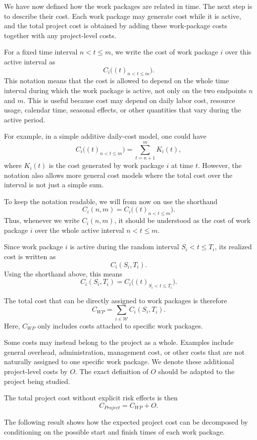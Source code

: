 \documentclass[11pt,a4paper]{article}
\newcommand{\cW}{\mathcal{W}}
\newcommand{\1}{\mathbf{1}}
\theoremstyle{definition}
\theoremstyle{plain}
\theoremstyle{remark}
\numberwithin{equation}{section}
\begin{document}
We have now defined how the work packages are related in time. The next step is to describe their cost. Each work package may generate cost while it is active, and the total project cost is obtained by adding these work-package costs together with any project-level costs.

For a fixed time interval $n<t\leq m$, we write the cost of work package $i$ over this active interval as
\[
C_i\bigl((t)_{n<t\leq m}\bigr).
\]
This notation means that the cost is allowed to depend on the whole time interval during which the work package is active, not only on the two endpoints $n$ and $m$. This is useful because cost may depend on daily labor cost, resource usage, calendar time, seasonal effects, or other quantities that vary during the active period.

For example, in a simple additive daily-cost model, one could have
\[
C_i\bigl((t)_{n<t\leq m}\bigr)
=
\sum_{t=n+1}^{m} K_i(t),
\]
where $K_i(t)$ is the cost generated by work package $i$ at time $t$. However, the notation also allows more general cost models where the total cost over the interval is not just a simple sum.

To keep the notation readable, we will from now on use the shorthand
\[
C_i(n,m)
=
C_i\bigl((t)_{n<t\leq m}\bigr).
\]
Thus, whenever we write $C_i(n,m)$, it should be understood as the cost of work package $i$ over the whole active interval $n<t\leq m$.

Since work package $i$ is active during the random interval $S_i<t\leq T_i$, its realized cost is written as
\[
C_i(S_i,T_i).
\]
Using the shorthand above, this means
\[
C_i(S_i,T_i)
=
C_i\bigl((t)_{S_i<t\leq T_i}\bigr).
\]

The total cost that can be directly assigned to work packages is therefore
\[
C_{WP}
=
\sum_{i\in\cW} C_i(S_i,T_i).
\]
Here, $C_{WP}$ only includes costs attached to specific work packages.

Some costs may instead belong to the project as a whole. Examples include general overhead, administration, management cost, or other costs that are not naturally assigned to one specific work package. We denote these additional project-level costs by $O$. The exact definition of $O$ should be adapted to the project being studied.

The total project cost without explicit risk effects is then
\[
C_{Project}=C_{WP}+O.
\]

The following result shows how the expected project cost can be decomposed by conditioning on the possible start and finish times of each work package.
\end{document}
